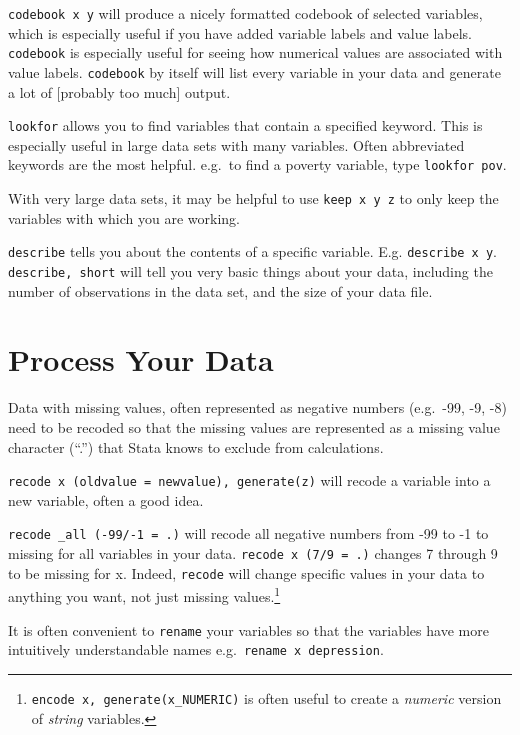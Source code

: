 \documentclass[
]{report}
\begin{document}
\texttt{codebook\ x\ y} will produce a nicely formatted codebook of
selected variables, which is especially useful if you have added
variable labels and value labels. \texttt{codebook} is especially useful
for seeing how numerical values are associated with value labels.
\texttt{codebook} by itself will list every variable in your data and
generate a lot of {[}probably too much{]} output.

\texttt{lookfor} allows you to find variables that contain a specified
keyword. This is especially useful in large data sets with many
variables. Often abbreviated keywords are the most helpful. e.g.~to find
a poverty variable, type \texttt{lookfor\ pov}.

With very large data sets, it may be helpful to use
\texttt{keep\ x\ y\ z} to only keep the variables with which you are
working.

\texttt{describe} tells you about the contents of a specific variable.
E.g. \texttt{describe\ x\ y}. \texttt{describe,\ short} will tell you
very basic things about your data, including the number of observations
in the data set, and the size of your data file.

\hypertarget{process-your-data}{%
\section{Process Your Data}\label{process-your-data}}

Data with missing values, often represented as negative numbers
(e.g.~-99, -9, -8) need to be recoded so that the missing values are
represented as a missing value character (``.'') that Stata knows to
exclude from calculations.

\texttt{recode\ x\ (oldvalue\ =\ newvalue),\ generate(z)} will recode a
variable into a new variable, often a good idea.

\texttt{recode\ \_all\ (-99/-1\ =\ .)} will recode all negative numbers
from -99 to -1 to missing for all variables in your data.
\texttt{recode\ x\ (7/9\ =\ .)} changes 7 through 9 to be missing for x.
Indeed, \texttt{recode} will change specific values in your data to
anything you want, not just missing values.\footnote{\texttt{encode\ x,\ generate(x\_NUMERIC)}
  is often useful to create a \emph{numeric} version of \emph{string}
  variables.}

It is often convenient to \texttt{rename} your variables so that the
variables have more intuitively understandable names
e.g.~\texttt{rename\ x\ depression}.
\end{document}
